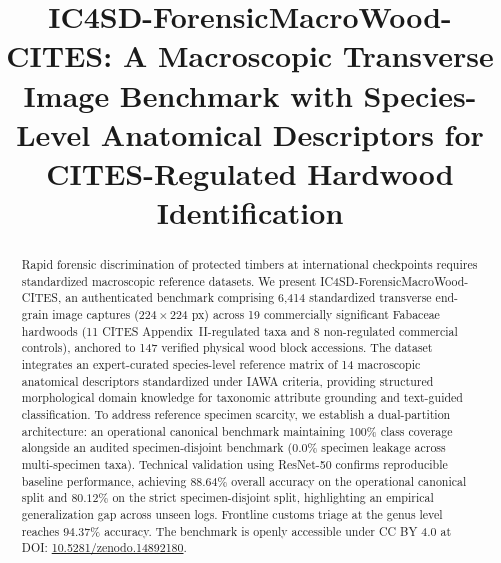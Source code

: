 \documentclass[a4paper,fleqn,12pt]{cas-sc}
\newcommand{\orcidicon}[1]{\href{https://orcid.org/#1}{\texorpdfstring{%
\begin{tikzpicture}[baseline=-0.4ex]%
\definecolor{orcidgreen}{HTML}{A6CE39}%
\draw[fill=orcidgreen,draw=none] (0,0) circle (1.0ex);%
\node at (0,0) {\color{white}\fontsize{4}{4}\selectfont\sffamily\bfseries iD};%
\end{tikzpicture}%
}{}}}
\begin{document}
\let\WriteBookmarks\relax


\title [mode = title]{IC4SD-ForensicMacroWood-CITES: A Macroscopic Transverse Image Benchmark with Species-Level Anatomical Descriptors for CITES-Regulated Hardwood Identification}




\begin{abstract}
Rapid forensic discrimination of protected timbers at international checkpoints requires standardized macroscopic reference datasets. We present IC4SD-ForensicMacroWood-CITES, an authenticated benchmark comprising 6,414 standardized transverse end-grain image captures ($224 \times 224$ px) across 19 commercially significant Fabaceae hardwoods (11 CITES Appendix~II-regulated taxa and 8 non-regulated commercial controls), anchored to 147 verified physical wood block accessions. The dataset integrates an expert-curated species-level reference matrix of 14 macroscopic anatomical descriptors standardized under IAWA criteria, providing structured morphological domain knowledge for taxonomic attribute grounding and text-guided classification. To address reference specimen scarcity, we establish a dual-partition architecture: an operational canonical benchmark maintaining 100\% class coverage alongside an audited specimen-disjoint benchmark ($0.0\%$ specimen leakage across multi-specimen taxa). Technical validation using ResNet-50 confirms reproducible baseline performance, achieving $88.64\%$ overall accuracy on the operational canonical split and $80.12\%$ on the strict specimen-disjoint split, highlighting an empirical generalization gap across unseen logs. Frontline customs triage at the genus level reaches $94.37\%$ accuracy. The benchmark is openly accessible under CC BY 4.0 at DOI: \href{https://doi.org/10.5281/zenodo.14892180}{10.5281/zenodo.14892180}.
\end{abstract}
\end{document}

